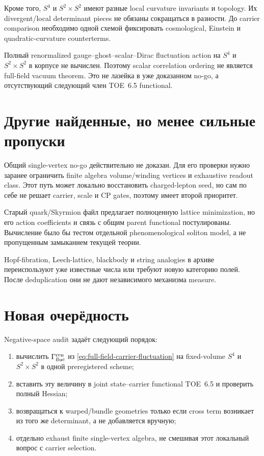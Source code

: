 Кроме того, \(S^4\) и \(S^2\times S^2\) имеют разные local curvature
invariants и topology. Их divergent/local determinant pieces не обязаны
сокращаться в разности. До carrier comparison необходимо одной схемой
фиксировать cosmological, Einstein и quadratic-curvature counterterms.

\begin{proposition}
Полный renormalized gauge--ghost--scalar--Dirac fluctuation action на
\(S^4\) и \(S^2\times S^2\) в корпусе не вычислен. Поэтому scalar
correlation ordering не является full-field vacuum theorem. Это не лазейка
в уже доказанном no-go, а отсутствующий следующий член TOE~6.5 functional.
\end{proposition}

\section{Другие найденные, но менее сильные пропуски}

Общий single-vertex no-go действительно не доказан. Для его проверки нужно
заранее ограничить finite algebra volume/winding vertices и exhaustive
readout class. Этот путь может локально восстановить charged-lepton seed,
но сам по себе не решает carrier, scale и CP gates, поэтому имеет второй
приоритет.

Старый quark/Skyrmion файл предлагает полноценную lattice minimization, но
его action coefficients и связь с общим parent functional постулированы.
Вычисление было бы тестом отдельной phenomenological soliton model, а не
пропущенным замыканием текущей теории.

Hopf-fibration, Leech-lattice, blackbody и string analogies в архиве
переиспользуют уже известные числа или требуют новую категорию полей. После
deduplication они не дают независимого механизма measure.

\section{Новая очерёдность}

Negative-space audit задаёт следующий порядок:
\begin{enumerate}
 \item вычислить \(\Gamma_{\rm fluc}^{\rm ren}\) из
 \eqref{eq:full-field-carrier-fluctuation} на fixed-volume
 \(S^4\) и \(S^2\times S^2\) в одной preregistered scheme;
 \item вставить эту величину в joint state--carrier functional TOE~6.5 и
 проверить полный Hessian;
 \item возвращаться к warped/bundle geometries только если cross term
 возникает из того же determinant, а не добавляется вручную;
 \item отдельно exhaust finite single-vertex algebra, не смешивая этот
 локальный вопрос с carrier selection.
\end{enumerate}


